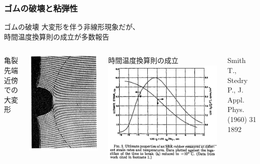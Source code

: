 \documentclass[12pt, dvipdfmx]{beamer}
\begin{document}
\begin{frame}
\begin{columns}[totalwidth=1\textwidth]
    \end{columns}
\end{frame}

\begin{frame}
	\frametitle{ゴムの破壊と粘弾性}
		\begin{alertblock}{ゴムの破壊}
			大変形を伴う非線形現象だが、\\時間温度換算則の成立が多数報告
		\end{alertblock}
		\vspace{2mm}
		\begin{columns}[T, totalwidth=\textwidth]
				亀裂先端近傍での大変形
				\vspace{-3mm}
				\begin{center}
					\includegraphics[width=.6\textwidth]{rubber_crack.png}
				\end{center}
				時間温度換算則の成立
				\includegraphics[width=.8\textwidth]{Time_Temp_2.png}

				{\tiny Smith T., Stedry P., J. Appl. Phys. (1960) 31 1892}
		\end{columns}
\end{frame}
\end{document}
